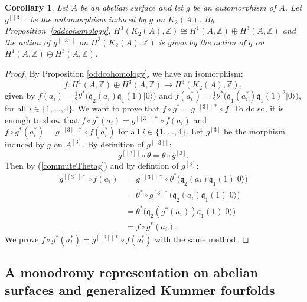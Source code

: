 \documentclass{alggeom}
\newcommand{\vac}{|0\rangle}
\newcommand{\q}{\mathfrak{q}}
\newcommand{\Z}{\mathbb{Z}}
\theoremstyle{plain}
\newtheorem{cor}[theorem]{Corollary}
\theoremstyle{definition}
\theoremstyle{remark}
\begin{document}
\begin{cor}\label{actionH3}
Let $A$ be an abelian surface and let $g$ be an automorphism of $A$. Let $g^{[[3]]}$ be the automorphism induced by $g$ on $K_2(A)$.
By Proposition~\ref{oddcohomology}, $H^3(K_2(A),\Z)\cong H^1(A,\Z)\oplus H^3(A,\Z)$ and the action of $g^{[[3]]}$ on $H^3(K_2(A),\Z)$ is given by the action of $g$ on $H^1(A,\Z)\oplus H^3(A,\Z)$.
\end{cor}
\begin{proof}
By Proposition \ref{oddcohomology}, we have an isomorphism:
$$f:H^1(A,\Z)\oplus H^3(A,\Z)\rightarrow H^3(K_2(A),\Z),$$
given by $f(a_i)=\frac{1}{2}\theta^*\Big(\q_2(a_i)\q_1(1)\vac\Big)$ and $f(a_i^*)=\frac{1}{2}\theta^*\Big( \q_1(a^*_i)\q_1(1)^2\vac \Big)$, for all $i\in\{1,...,4\}$.
We want to prove that $f\circ g^*=g^{[[3]]*}\circ f$. 
To do so, it is enough to show that $f\circ g^*(a_i)=g^{[[3]]*}\circ f(a_i)$ and $f\circ g^*(a_i^*)=g^{[[3]]*}\circ f(a_i^*)$ for all $i\in\{1,...,4\}$.
Let $g^{[3]}$ be the morphism induced by $g$ on $A^{[3]}$. By definition of $g^{[[3]]}$:
\begin{equation}
g^{[[3]]}\circ \theta=\theta\circ g^{[3]}.
\label{commuteThetag}
\end{equation}
Then by (\ref{commuteThetag}) and by defintion of $g^{[3]}$:
\begin{align*}
 g^{[[3]]*}\circ f(a_i)&=g^{[[3]]*}\circ\theta^*\Big(\q_2(a_i)\q_1(1)\vac\Big)\\
 &=\theta^*\circ g^{[3]*}\Big(\q_2(a_i)\q_1(1)\vac\Big)\\
 &=\theta^*\Big(\q_2(g^*(a_i))\q_1(1)\vac\Big)\\
 &=f\circ g^*(a_i).
\end{align*}
We prove $f\circ g^*(a_i^*)=g^{[[3]]*}\circ f(a_i^*)$ with the same method.


\end{proof}

\subsection{A monodromy representation on abelian surfaces and generalized Kummer fourfolds}\label{monodromyexplication}
\end{document}
